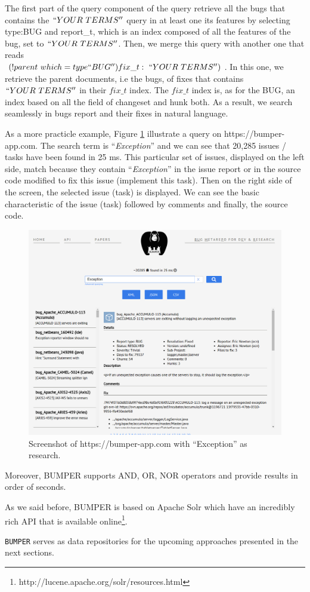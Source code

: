 The first part of the query component of the query retrieve all the bugs that contains the $``YOUR~TERMS''$ query in at least one its features by selecting type:BUG and report\_t, which is an index composed of all the features of the bug, set to $``YOUR~TERMS''$.
Then, we merge this query with another one that reads \\
$(!parent~which=type``BUG'')fix\_t:~``YOUR~TERMS'')$.
In this one, we retrieve the parent documents, i.e the bugs, of fixes that contains $``YOUR~TERMS''$ in their $fix\_t$ index.
The $fix\_t$ index is, as for the BUG, an index based on all the field of changeset and hunk both. As a result, we search seamlessly in bugs report and their fixes in natural language.

As a more practicle example, Figure \ref{fig:bumper-live} illustrate a query on https://bumper-app.com. The search term is  ``{\it Exception}'' and we can see that 20,285 issues / tasks have been found in 25 ms. This particular set of issues, displayed on the left side, match because they contain ``{\it Exception}'' in the issue report or in the source code modified to fix this issue (implement this task). Then on the right side of the screen, the selected issue (task) is displayed. We can see the basic characteristic of the issue (task) followed by comments and finally, the source code.

\begin{figure}[h!]
  \centering
    \includegraphics[scale=0.4]{media/bumper-live.png}
    \caption{Screenshot of https://bumper-app.com with ``Exception'' as research.
    \label{fig:bumper-live}}
\end{figure}


Moreover, BUMPER supports AND, OR, NOR operators and provide results in order of seconds.

As we said before, BUMPER is based on Apache Solr which have an incredibly rich API that is available online\footnote{ http://lucene.apache.org/solr/resources.html}.

{\tt BUMPER} serves as data repositories for the upcoming approaches presented in the next sections.
